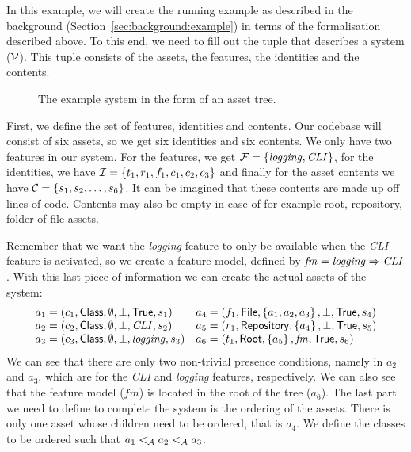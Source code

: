\begin{example}\label{example:basicsystem}
In this example, we will create the running example as described in the background
(Section~\ref{sec:background:example}) in terms of the formalisation described above.
To this end, we need to fill out the tuple that describes a system (\( \mathcal{V} \)).
This tuple consists of the assets, the features, the identities and the contents.
\end{example}
\begin{wrapfigure}{r}{0.3\textwidth}
  \centering
  \caption{The example system in the form of an asset tree.}
  \label{fig:example:basicsystem}
\end{wrapfigure}
First, we define the set of features, identities and contents. Our codebase
will consist of six assets, so we get six identities and six contents. We only
have two features in our system. For the features, we get \( \mathcal{F} = \left\{ \mathit{logging}, \mathit{CLI} \right\} \),
for the identities, we have \( \mathcal{I} = \left\{ t_1, r_1, f_1, c_1, c_2, c_3 \right\} \)
and finally for the asset contents we have \( \mathcal{C} = \left\{ s_1, s_2, \dots, s_6 \right\} \).
It can be imagined that these contents are made up off lines of code. Contents
may also be empty in case of for example root, repository, folder of file assets.

Remember that we want the \emph{logging} feature to only be
available when the \emph{CLI} feature is activated, so we create a feature model,
defined by \( \mathit{fm} = \mathit{logging} \Rightarrow \mathit{CLI} \).
With this last piece of information we can create the actual assets of the system:
\[
  \begin{array}{ll}
    a_1 = \left( c_1, {\sf Class}, \emptyset, \bot, {\sf True}, s_1 \right) & a_4 = \left( f_1, {\sf File}, \left\{ a_1, a_2, a_3 \right\}, \bot, {\sf True}, s_4 \right) \\
    a_2 = \left( c_2, {\sf Class}, \emptyset, \bot, \mathit{CLI}, s_2 \right) & a_5 = \left( r_1, {\sf Repository}, \left\{ a_4 \right\}, \bot, {\sf True}, s_5 \right)\\
    a_3 = \left( c_3, {\sf Class}, \emptyset, \bot, \mathit{logging}, s_3 \right) & a_6 = \left( t_1, {\sf Root}, \left\{ a_5 \right\}, \mathit{fm}, {\sf True}, s_6 \right)
  \end{array}
\]
We can see that there are only two non-trivial presence conditions, namely in
$a_2$ and $a_3$, which are for the \emph{CLI} and \emph{logging} features,
respectively. We can also see that the feature model (\(\mathit{fm}\)) is
located in the root of the tree ($a_6$). The last part we need to define to
complete the system is the ordering of the assets. There is only one asset
whose children need to be ordered, that is $a_4$. We define the classes to be
ordered such that \(a_1 <_{\mathcal{A}} a_2 <_{\mathcal{A}} a_3 \).

